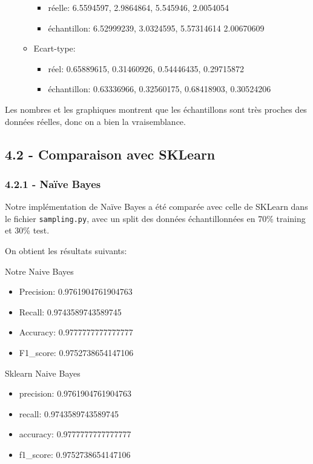\documentclass[
]{article}
\providecommand{\tightlist}{%
  \setlength{\itemsep}{0pt}\setlength{\parskip}{0pt}}
\begin{document}
\begin{itemize}
\begin{itemize}
    \begin{itemize}
    \tightlist
    \item
      réelle: 6.5594597, 2.9864864, 5.545946, 2.0054054
    \item
      échantillon: 6.52999239, 3.0324595, 5.57314614 2.00670609
    \end{itemize}
  \item
    Ecart-type:

    \begin{itemize}
    \tightlist
    \item
      réel: 0.65889615, 0.31460926, 0.54446435, 0.29715872
    \item
      échantillon: 0.63336966, 0.32560175, 0.68418903, 0.30524206
    \end{itemize}
  \end{itemize}
\end{itemize}

Les nombres et les graphiques montrent que les échantillons sont très
proches des données réelles, donc on a bien la vraisemblance.

\subsection{4.2 - Comparaison avec
SKLearn}\label{comparaison-avec-sklearn}

\subsubsection{4.2.1 - Naïve Bayes}\label{nauxefve-bayes}

Notre implémentation de Naïve Bayes a été comparée avec celle de SKLearn
dans le fichier \texttt{sampling.py}, avec un split des données
échantillonnées en 70\% training et 30\% test.

On obtient les résultats suivants:

Notre Naive Bayes

\begin{itemize}
\item
  Precision: 0.9761904761904763
\item
  Recall: 0.9743589743589745
\item
  Accuracy: 0.9777777777777777
\item
  F1\_score: 0.9752738654147106
\end{itemize}

Sklearn Naive Bayes

\begin{itemize}
\item
  precision: 0.9761904761904763
\item
  recall: 0.9743589743589745
\item
  accuracy: 0.9777777777777777
\item
  f1\_score: 0.9752738654147106
\end{itemize}
\end{document}
